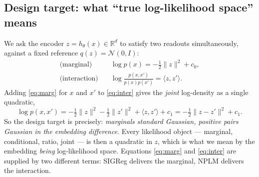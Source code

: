 \documentclass[11pt]{article}
\begin{document}
\subsection{Design target: what ``true log-likelihood space'' means}
We ask the encoder $z=h_\theta(x)\in\mathbb{R}^d$ to satisfy two readouts
simultaneously, against a fixed reference $q(z)=\mathcal{N}(0,I)$:
\begin{align}
\text{(marginal)}\quad & \log p(x) = -\tfrac12\|z\|^2 + c_0,
\label{eq:marg}\\[2pt]
\text{(interaction)}\quad & \log\frac{p(x,x')}{p(x)p(x')} = \langle z, z'\rangle.
\label{eq:inter}
\end{align}
Adding \eqref{eq:marg} for $x$ and $x'$ to \eqref{eq:inter} gives the \emph{joint}
log-density as a single quadratic,
\begin{equation}
\log p(x,x')
= -\tfrac12\|z\|^2 - \tfrac12\|z'\|^2 + \langle z,z'\rangle + c_1
= -\tfrac12\|z-z'\|^2 + c_1.
\label{eq:joint}
\end{equation}
So the design target is precisely: \emph{marginals standard Gaussian, positive
pairs Gaussian in the embedding difference}. Every likelihood object --- marginal,
conditional, ratio, joint --- is then a quadratic in $z$, which is what we mean by
the embedding \emph{being} log-likelihood space. Equations \eqref{eq:marg} and
\eqref{eq:inter} are supplied by two different terms: SIGReg delivers the
marginal, NPLM delivers the interaction.
\end{document}
